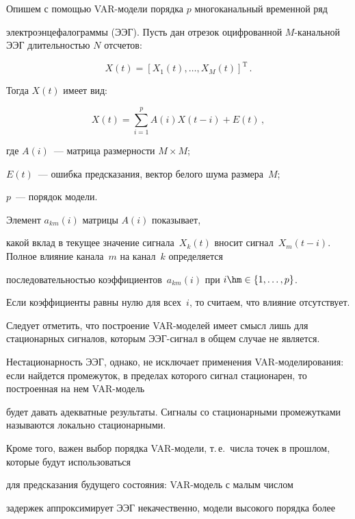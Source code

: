 Опишем  с помощью VAR-модели порядка $p$ многоканальный временной ряд 


электроэнцефалограммы (ЭЭГ). Пусть дан отрезок оцифрованной $M$-канальной ЭЭГ длительностью $N$ отсчетов:


$$


X(t) = \left[X_1(t), \ldots , X_M(t)\right]^{\mathrm{T}}\,.


$$


Тогда $X(t)$ имеет вид:


$$


X(t) = \sum\limits_{i=1}^{p} A(i)X(t-i) + E(t)\,,


$$


где $A(i)$~--- матрица размерности $M \times M$; 


    $E(t)$~--- ошибка предсказания, вектор белого шума размера~$M$; 


    $p$~--- порядок модели.





Элемент $a_{km}(i)$ матрицы $A(i)$ показывает,


какой вклад в текущее значение сигнала~$X_k(t)$ вносит сигнал~$X_m(t-i)$. Полное влияние канала~$m$ на канал~$k$ определяется


последовательностью коэффициентов~$a_{km}(i)$ при $i \hm\in \{1, \ldots , p\}$.


Если коэффициенты равны нулю для всех~$i$, то считаем, что влияние отсутствует.





Следует отметить, что построение VAR-мо\-де\-лей имеет смысл лишь для стационарных сигналов, которым ЭЭГ-сигнал в общем случае не является.


Нестационарность ЭЭГ, однако, не исключает применения VAR-моделирования: если найдется промежуток, в пределах которого сигнал стационарен, то построенная на нем VAR-мо\-дель


будет давать адекватные результаты. Сигналы со стационарными промежутками называются локально стационарными.





Кроме того, важен выбор порядка VAR-модели, т.\,е.\ числа точек в прошлом, которые будут использоваться 


для предсказания будущего состояния: VAR-мо\-дель с малым числом


задержек аппроксимирует ЭЭГ некачественно, модели высокого порядка более 


